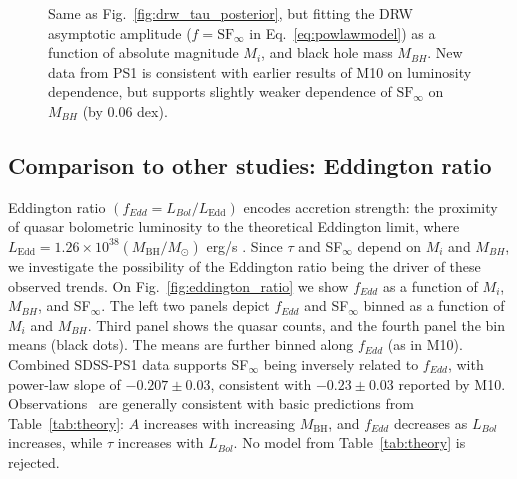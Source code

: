 \documentclass[twocolumn]{aastex62}
\begin{document}
\begin{figure*}
	\caption{Same as Fig.~\ref{fig:drw_tau_posterior}, but fitting the DRW asymptotic amplitude ($f = \mathrm{SF}_{\infty}$ in Eq.~\ref{eq:powlawmodel})  as a function of absolute magnitude $M_{i}$, and black hole mass $M_{BH}$. New data from PS1 is consistent with earlier results of M10 on luminosity dependence, but supports slightly weaker dependence of $\mathrm{SF}_{\infty}$ on $M_{BH}$ (by 0.06 dex).}
	\label{fig:drw_sf_posterior}
\end{figure*} 

 

\subsection{Comparison to other studies: Eddington ratio}

Eddington ratio $(f_{Edd} {=} L_{Bol}/L_{\mathrm{Edd}})$ encodes accretion strength: the proximity of quasar bolometric luminosity to the theoretical Eddington limit, where $L_{\mathrm{Edd}} {=} 1.26 {\times} 10^{38} (M_{\mathrm{BH}} / M_{\odot})$ erg/s \citep{shen2011}. Since $\tau$ and SF$_{\infty}$ depend on $M_{i}$ and $M_{BH}$, we investigate the possibility of the Eddington ratio being the driver of these observed trends. On Fig.~\ref{fig:eddington_ratio} we show $f_{Edd} $ as a function of $M_{i}$, $M_{BH}$, and SF$_{\infty}$. The left two panels depict  $f_{Edd} $ and SF$_{\infty}$ binned as a function of $M_{i}$ and $M_{BH}$. Third panel shows the quasar counts, and the fourth panel the bin means (black dots). The means are further binned along  $f_{Edd} $ (as in M10). Combined SDSS-PS1 data supports SF$_{\infty}$  being inversely related to  $f_{Edd} $, with power-law slope of $-0.207 \pm 0.03$, consistent with  $-0.23 \pm 0.03$ reported by M10. Observations \ are generally consistent with basic predictions from Table~\ref{tab:theory}: $A$ increases with increasing  $M_{\mathrm{BH}}$, and  $f_{Edd} $ decreases as $L_{Bol}$ increases, while $\tau$ increases with  $L_{Bol}$. No model from  Table~\ref{tab:theory} is rejected. 
\end{document}

